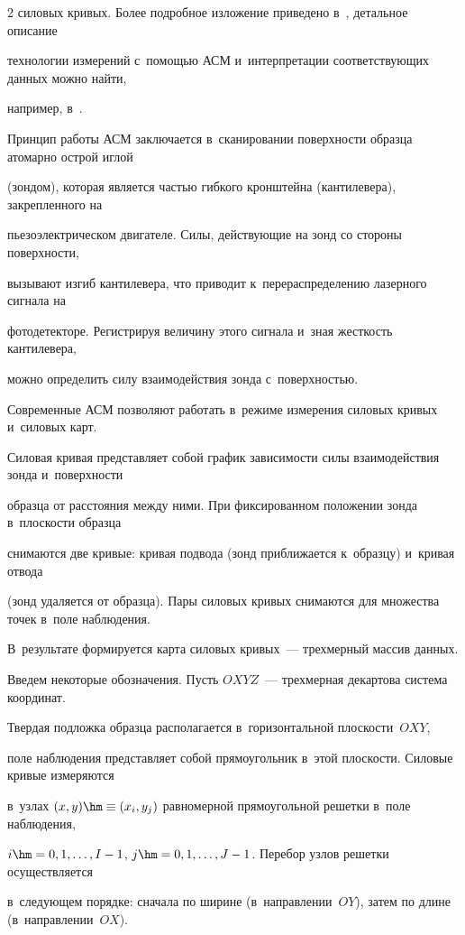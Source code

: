 \begin{multicols}{2}
силовых кривых. Более подробное изложение приведено в~\cite{b1}, детальное описание 

технологии \mbox{измерений} с~по\-мощью АСМ и~интерпретации со\-от\-вет\-ст\-ву\-ющих данных можно найти, 

например, в~\cite{b2}.



Принцип работы АСМ заключается в~сканировании поверхности образца атомарно острой иглой 

(зондом), которая является частью гибкого кронштейна (кантилевера), закрепленного на 

пьезоэлектрическом двигателе. Силы, действующие на зонд со стороны поверхности, 

вызывают изгиб кантилевера, что приводит к~перераспределению лазерного сигнала на 

фотодетекторе. Регистрируя величину этого сигнала и~зная жесткость кантилевера, 

можно определить силу взаимодействия зонда с~поверхностью.



Современные АСМ позволяют работать в~режиме измерения силовых кривых и~силовых карт. 

Силовая кривая представляет собой график зависимости силы взаимодействия зонда и~поверхности 

образца от расстояния между ними. При фиксированном положении зонда в~плоскости образца 

снимаются две кривые: кривая подвода (зонд приближается к~образцу) и~кривая отвода 

(зонд удаляется от образца). Пары силовых кривых снимаются для множества точек в~поле наблюдения. 

В~результате формируется карта силовых кривых~--- трехмерный массив данных.



Введем некоторые обозначения. Пусть $OXYZ$~--- трехмерная декартова система координат. 

Твердая подложка образца располагается в~горизонтальной плоскости~$OXY$, 

поле наблюдения представляет собой прямоугольник в~этой плоскости. Силовые кривые измеряются 

в~узлах $(x,y)\hm\equiv (x_i,y_j)$ равномерной прямоугольной решетки в~поле наблюдения, 

$i\hm=0,1,\ldots,I-1$, $j\hm=0,1,\ldots,J-1$. Перебор узлов решетки осуществляется 

в~следующем порядке: сначала по ширине (в~на\-прав\-ле\-нии~$OY$), затем по длине (в~на\-прав\-ле\-нии~$OX$). 


\end{multicols}
